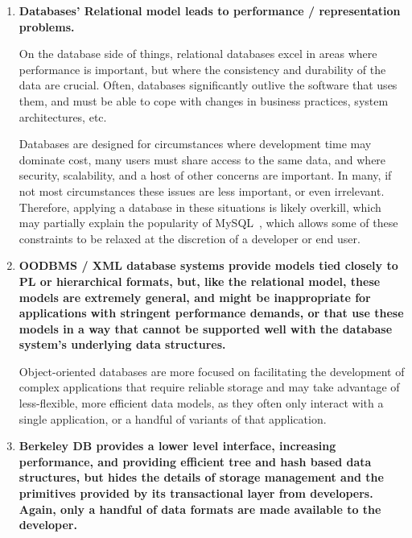 \documentclass[letterpaper,english]{article}
\begin{document}
\begin{enumerate}

  \item{\bf Databases' Relational model leads to performance /
  representation problems.}

On the database side of things, relational databases excel in areas
where performance is important, but where the consistency and
durability of the data are crucial.  Often, databases significantly
outlive the software that uses them, and must be able to cope with
changes in business practices, system architectures,
etc.~\cite{relational}

Databases are designed for circumstances where development time may
dominate cost, many users must share access to the same data, and
where security, scalability, and a host of other concerns are
important.  In many, if not most circumstances these issues are less
important, or even irrelevant.  Therefore, applying a database in
these situations is likely overkill, which may partially explain the
popularity of MySQL~\cite{mysql}, which allows some of these
constraints to be relaxed at the discretion of a developer or end
user.

  \item{\bf OODBMS / XML database systems provide models tied closely to PL
  or hierarchical formats, but, like the relational model, these
  models are extremely general, and might be inappropriate for
  applications with stringent performance demands, or that use these
  models in a way that cannot be supported well with the database
  system's underlying data structures.}

Object-oriented databases are more focused on facilitating the
development of complex applications that require reliable storage and
may take advantage of less-flexible, more efficient data models, as
they often only interact with a single application, or a handful of
variants of that application.~\cite{lamb}

  \item{\bf Berkeley DB provides a lower level interface, increasing
  performance, and providing efficient tree and hash based data
  structures, but hides the details of storage management and the
  primitives provided by its transactional layer from
  developers. Again, only a handful of data formats are made available
  to the developer.}



\end{enumerate}
\end{document}
